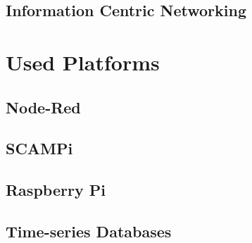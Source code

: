 \subsection{Information Centric Networking}

\section{Used Platforms}
\subsection{Node-Red}
\subsection{SCAMPi}
\subsection{Raspberry Pi}
\subsection{Time-series Databases}


